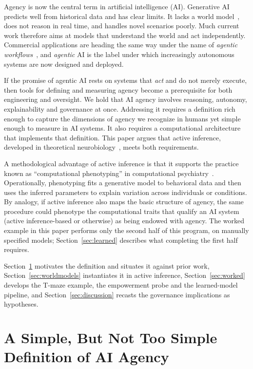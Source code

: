 \documentclass[letterpaper]{article} %
\theoremstyle{definition}
\begin{document}
Agency is now the central term in artificial intelligence (AI). Generative AI predicts well from historical data and has clear limits. It lacks a world model~\citep{lecunPathAutonomousMachine2022}, does not reason in real time, and handles novel scenarios poorly. Much current work therefore aims at models that understand the world and act independently. Commercial applications are heading the same way under the name of \emph{agentic workflows}~\citep{ngAgenticDesignPatterns2024}, and \emph{agentic} AI is the label under which increasingly autonomous systems are now designed and deployed.

If the promise of agentic AI rests on systems that \emph{act} and do not merely execute, then tools for defining and measuring agency become a prerequisite for both engineering and oversight. We hold that AI agency involves reasoning, autonomy, explainability and governance at once. Addressing it requires a definition rich enough to capture the dimensions of agency we recognize in humans yet simple enough to measure in AI systems. It also requires a computational architecture that implements that definition. This paper argues that active inference, developed in theoretical neurobiology~\citep{parrActiveInferenceFree2022a}, meets both requirements.

A methodological advantage of active inference is that it supports the practice known as ``computational phenotyping'' in computational psychiatry~\citep{montagueComputationalPsychiatry2012,schwartenbeck2016computational,smithStepByStep2022}. Operationally, phenotyping fits a generative model to behavioral data and then uses the inferred parameters to explain variation across individuals or conditions. By analogy, if active inference also maps the basic structure of agency, the same procedure could phenotype the computational traits that qualify an AI system (active inference-based or otherwise) as being endowed with agency. The worked example in this paper performs only the second half of this program, on manually specified models; Section~\ref{sec:learned} describes what completing the first half requires.

Section~\ref{sec:definition} motivates the definition and situates it against prior work, Section~\ref{sec:worldmodels} instantiates it in active inference, Section~\ref{sec:worked} develops the T-maze example, the empowerment probe and the learned-model pipeline, and Section~\ref{sec:discussion} recasts the governance implications as hypotheses.

\section{A Simple, But Not Too Simple Definition of AI Agency}\label{sec:definition}
\end{document}
